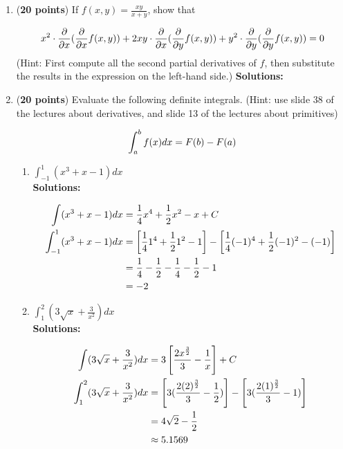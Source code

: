 \documentclass[a4paper]{article}
\begin{document}
\begin{enumerate}
\begin{enumerate}
		
\end{enumerate}

\item (\textbf{20 points}) If $f(x,y) = \frac{xy}{x+y}$, show that

\begin{align}
x^2 \cdot \frac{\partial}{\partial x}(\frac{\partial}{\partial x}f(x,y)) + 2xy \cdot \frac{\partial}{\partial x}(\frac{\partial}{\partial y}f(x,y)) + y^2 \cdot \frac{\partial}{\partial y}(\frac{\partial}{\partial y}f(x,y)) = 0\notag
\end{align}
	(Hint: First compute all the second partial derivatives of $f$, then substitute the results in the expression on the left-hand side.)
\textbf{Solutions:}		




\item (\textbf{20 points}) Evaluate the following definite integrals. (Hint: use slide 38 of the lectures about derivatives, and slide 13 of the lectures about primitives)

\begin{align}
	\int_{a}^b f(x) dx = F(b) - F(a)\notag
\end{align}



\begin{enumerate}
	\item $\int_{-1}^1(x^3 + x - 1)dx$\\
	
	\textbf{Solutions:}
	
\begin{align}
	\int (x^3 + x - 1)dx &= \frac{1}{4}x^4 + \frac{1}{2}x^2 - x + C \notag\\
	\int_{-1}^1(x^3 + x - 1)dx &= \left[ \frac{1}{4}1^4 + \frac{1}{2}1^2 - 1  \right] - \left[ \frac{1}{4}(-1)^4 + \frac{1}{2}(-1)^2 - (-1)\right]\notag\\
	&= \frac{1}{4} - \frac{1}{2} - \frac{1}{4} - \frac{1}{2} - 1\notag\\
	&= -2\notag
\end{align}	
	
	
	\item $\int_{1}^2(3\sqrt{x} + \frac{3}{x^2})dx$\\
	
	\textbf{Solutions:}
	
\begin{align}
	\int(3\sqrt{x} + \frac{3}{x^2})dx &= 3 \left[ \frac{2x^\frac{3}{2}}{3} - \frac{1}{x}\right] + C\notag\\
	\int_{1}^2(3\sqrt{x} + \frac{3}{x^2})dx &= \left[ 3(\frac{2(2)^\frac{3}{2}}{3} - \frac{1}{2})\right] - \left[ 3(\frac{2(1)^\frac{3}{2}}{3} - 1) \right]\notag\\
	&= 4\sqrt{2} - \frac{1}{2}\notag\\
	&\approx 5.1569\notag
\end{align}		
	

\end{enumerate}
\end{enumerate}
\end{document}
